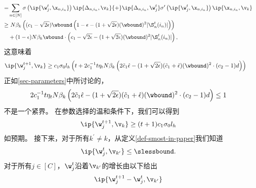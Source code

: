 \begin{myproof}
\begin{equation}
\begin{aligned}
    =& \sum_{n \in [N]} \sigma\left(\ip{\w_j^{t},\x_{n,i_n}}   \right) \ip{\Delta_{n,i_n},\v_k} 
    {+} \ip{\Delta_{n,i_n}, \w_j^{t}} \sigma^{\prime}\left(\ip{\w_j^{t},\x_{n,i_n}}  \right) \ip{\x_{n,i_n},\v_k} \\
    \geq& \ N \beta_k \left(
    (c_1 - \sqrt{2\epsilon}) \wbound \left( 1 - \epsilon - (1 + \sqrt{2 \epsilon})(\wbound)^2|\S^t_n(i_n)| \right)\right) \\
    &+ (1 - \epsilon) N \beta_k \wbound \cdot \left( c_1 
    - \sqrt{2\epsilon} 
    - (1 + \sqrt{2\epsilon})(\wbound)^2 |\S_n^t(i_n)| \right),
\end{aligned}\end{equation}
这意味着 
\begin{equation}\label{eq-theorem-phase-I-main-smost-what-we-need-1}
\begin{aligned}
        \ip{ \w_j^{t+1} , \v_{k} } &\geq  c_1 \sigma_0 l_h \left( t + 2c_1^{-1}t\eta_t N\beta_k\left( 
        2\tilde{c}_1\hat{\epsilon} - (1+\sqrt{2\epsilon})(\tilde{c}_1 + \hat{\epsilon})(\wbound)^2  \cdot  (c_2 - 1)d
        \right)  \right)
\end{aligned}
\end{equation}
正如\cref{sec-parameters}中所讨论的，
\begin{equation}\label{eq-conditions-on-parameters-1}
    2c_1^{-1}t\eta_t N\beta_k\left( 
        2\tilde{c}_1\hat{\epsilon} - (1+\sqrt{2\epsilon})(\tilde{c}_1 + \hat{\epsilon})(\wbound)^2  \cdot  (c_2 - 1)d
        \right) \leq 1
\end{equation}
不是一个紧界。
在参数选择的温和条件下，我们可以得到
\begin{equation}
    \ip{\w_j^{t+1}, \v_k} \geq (t+1) c_1 \sigma_0 l_h
\end{equation}
如预期。
接下来，对于所有$k^{\prime} \neq k $，从定义\cref{def-smost-in-paper}我们知道
\begin{equation}
    \ip{ \w_{j}^{t} , \v_{k^{\prime}} } \leq \slessbound. 
\end{equation}
对于所有$ j \in [C]$，$\w_{j}^{t}$沿着$\v_{k^{\prime}}$的增长由以下给出
\begin{equation}\label{eq-theorem-phase-I-main-wjt+1-wjt-kprime}
\begin{aligned}
    &\ip{\w^{t+1}_j - \w^{t}_j,\v_{k^{\prime}}} \\

\end{aligned}
\end{equation}
\end{myproof}
